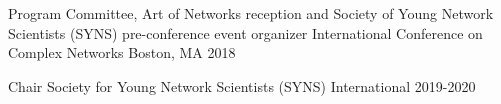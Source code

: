 \begin{cvhonors}

  \cvhonor
    {Program Committee, Art of Networks reception and Society of Young Network Scientists (SYNS) pre-conference event organizer} %
    {International Conference on Complex Networks} %
    {Boston, MA} %
    {2018} %







\cvhonor
	{Chair} %
	{Society for Young Network Scientists (SYNS)} %
	{International} %
	{2019-2020} %







\end{cvhonors}
